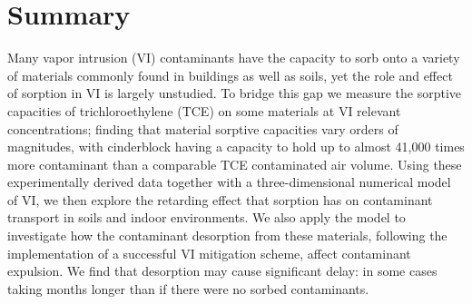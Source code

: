 \section{Summary}

Many vapor intrusion (VI) contaminants have the capacity to sorb onto a variety of materials commonly found in buildings as well as soils, yet the role and effect of sorption in VI is largely unstudied.
To bridge this gap we measure the sorptive capacities of trichloroethylene (TCE) on some materials at VI relevant concentrations; finding that material sorptive capacities vary orders of magnitudes, with cinderblock having a capacity to hold up to almost 41,000 times more contaminant than a comparable TCE contaminated air volume.
Using these experimentally derived data together with a three-dimensional numerical model of VI, we then explore the retarding effect that sorption has on contaminant transport in soils and indoor environments.
We also apply the model to investigate how the contaminant desorption from these materials, following the implementation of a successful VI mitigation scheme, affect contaminant expulsion.
We find that desorption may cause significant delay: in some cases taking months longer than if there were no sorbed contaminants.
